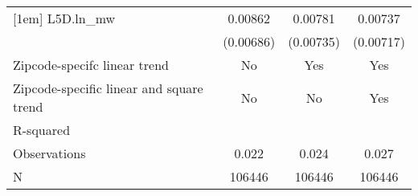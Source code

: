 {\begin{tabular}{l*{3}{c}}
[1em]
L5D.ln\_mw &  0.00862         &  0.00781         &  0.00737         \\
          &(0.00686)         &(0.00735)         &(0.00717)         \\
\hline
Zipcode-specifc linear trend&       No         &      Yes         &      Yes         \\
Zipcode-specific linear and square trend&       No         &       No         &      Yes         \\
R-squared &                  &                  &                  \\
Observations&    0.022         &    0.024         &    0.027         \\
N         &   106446         &   106446         &   106446         \\
\hline\hline
\end{tabular}
}
